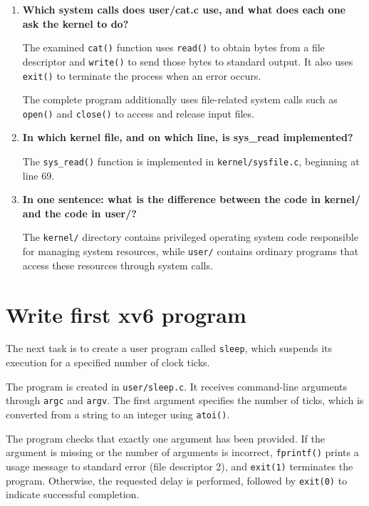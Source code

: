 \documentclass{tum_report}
\begin{document}
\begin{enumerate}
    \item \textbf{Which system calls does user/cat.c use,
    and what does each one ask the kernel to do?}

    The examined \texttt{cat()} function uses
    \texttt{read()} to obtain bytes from a file descriptor
    and \texttt{write()} to send those bytes to standard
    output. It also uses \texttt{exit()} to terminate the
    process when an error occurs.

    The complete program additionally uses file-related
    system calls such as \texttt{open()} and \texttt{close()}
    to access and release input files.

    \item \textbf{In which kernel file, and on which line,
    is sys\_read implemented?}

    The \texttt{sys\_read()} function is implemented in
    \texttt{kernel/sysfile.c}, beginning at line 69.

    \item \textbf{In one sentence: what is the difference
    between the code in kernel/ and the code in user/?}

    The \texttt{kernel/} directory contains privileged
    operating system code responsible for managing system
    resources, while \texttt{user/} contains ordinary
    programs that access these resources through system calls.
\end{enumerate}


\section{Write first xv6 program}

The next task is to create a user program called \texttt{sleep}, which
suspends its execution for a specified number of clock ticks.

The program is created in \texttt{user/sleep.c}. It receives command-line
arguments through \texttt{argc} and \texttt{argv}. The first argument
specifies the number of ticks, which is converted from a string to an
integer using \texttt{atoi()}.

The program checks that exactly one argument has been provided.
If the argument is missing or the number of arguments is incorrect,
\texttt{fprintf()} prints a usage message to standard error
(file descriptor 2), and \texttt{exit(1)} terminates the program.
Otherwise, the requested delay is performed, followed by
\texttt{exit(0)} to indicate successful completion.
\end{document}
